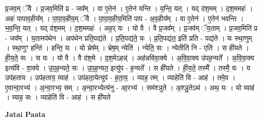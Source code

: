 \documentclass[17pt]{extarticle}
\begin{document}
प्र॒जव॒म् ॅवै । प्र॒जव॒मिति॑ प्र - जव᳚म् । वा ए॒तेन॑ । ए॒तेन॑ यन्ति । य॒न्ति॒ यत् । यद् द॑श॒मम् । द॒श॒ममहः॑ । अहः॑ पापाव॒हीय᳚म् । पा॒पा॒व॒हीय॒म् ॅवै । पा॒पा॒व॒हीय॒मिति॑ पाप - अ॒व॒हीय᳚म् । वा ए॒तेन॑ । ए॒तेन॑ भवन्ति । भ॒व॒न्ति॒ यत् । यद् द॑श॒मम् । द॒श॒ममहः॑ । अह॒र् यः । यो वै । वै प्र॒जव᳚म् । प्र॒जव॑म् ॅय॒ताम् । प्र॒जव॒मिति॑ प्र - जव᳚म् । य॒तामप॑थेन । अप॑थेन प्रति॒पद्य॑ते । प्र॒ति॒पद्य॑ते॒ यः । प्र॒ति॒पद्य॑त॒ इति॑ प्रति - पद्य॑ते । यः स्था॒णुम् । स्था॒णुꣳ हन्ति॑ । हन्ति॒ यः । यो भ्रेष᳚म् । भ्रेष॒म् न्येति॑ । न्येति॒ सः । न्येतीति॑ नि - एति॑ । स ही॑यते । ही॒य॒ते॒ सः । स यः । यो वै । वै द॑श॒मे । द॒श॒मेऽहन्न्॑ । अह॑न्नविवा॒क्ये । अ॒वि॒वा॒क्य उ॑पह॒न्यते᳚ । अ॒वि॒वा॒क्य इत्य॑वि - वा॒क्ये । उ॒प॒ह॒न्यते॒ सः । उ॒प॒ह॒न्यत॒ इत्यु॑प - ह॒न्यते᳚ । स ही॑यते । ही॒य॒ते॒ तस्मै᳚ । तस्मै॒ यः । य उप॑हताय । उप॑हताय॒ व्याह॑ । उप॑हता॒येत्युप॑ - ह॒ता॒य॒ । व्याह॒ तम् । व्याहेति॑ वि - आह॑ । तमे॒व । ए॒वान्वा॒रभ्य॑ । अ॒न्वा॒रभ्य॒ सम् । अ॒न्वा॒रभ्येत्य॑नु - आ॒रभ्य॑ । सम॑श्ञुते । अ॒श्ञु॒तेऽथ॑ । अथ॒ यः । यो व्याह॑ । व्याह॒ सः । व्याहेति॑ वि - आह॑ । स ही॑यते \newline

\textbf{Jatai Paata} \newline
\end{document}
